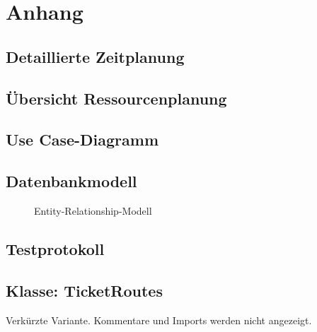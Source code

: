\section{Anhang}
\subsection{Detaillierte Zeitplanung}
\label{app:Zeitplanung}


\subsection{Übersicht Ressourcenplanung}
\label{app:Ressourcenplanung}



\clearpage

\subsection{Use Case-Diagramm}
\label{app:UseCase}




\subsection{Datenbankmodell}
\label{app:Datenbankmodell}

\begin{figure}[htb]
\centering
{}
\caption{Entity-Relationship-Modell}
\end{figure}
\clearpage




\subsection{Testprotokoll}
\label{app:test}
\clearpage
{}
\clearpage

\subsection{Klasse: TicketRoutes}
\label{app:CNMI}
Verkürzte Variante. Kommentare und Imports werden nicht angezeigt.

\clearpage

